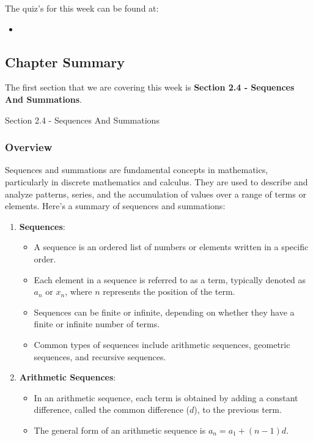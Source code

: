 The quiz's for this week can be found at:

\begin{itemize}
    \item {}
\end{itemize}

\subsection{Chapter Summary}

The first section that we are covering this week is \textbf{Section 2.4 - Sequences And Summations}.

\begin{notes}{Section 2.4 - Sequences And Summations}
    \subsubsection*{Overview}

    Sequences and summations are fundamental concepts in mathematics, particularly in discrete mathematics and calculus. They are used to describe and analyze patterns, series, and the accumulation 
    of values over a range of terms or elements. Here's a summary of sequences and summations:

    \begin{enumerate}[label=\arabic*.]
        \item \textbf{Sequences}:
        \begin{itemize}
            \item A sequence is an ordered list of numbers or elements written in a specific order.
            \item Each element in a sequence is referred to as a term, typically denoted as $a_n$ or $x_n$, where $n$ represents the position of the term.
            \item Sequences can be finite or infinite, depending on whether they have a finite or infinite number of terms.
            \item Common types of sequences include arithmetic sequences, geometric sequences, and recursive sequences.
        \end{itemize}
        
        \item \textbf{Arithmetic Sequences}:
        \begin{itemize}
            \item In an arithmetic sequence, each term is obtained by adding a constant difference, called the common difference ($d$), to the previous term.
            \item The general form of an arithmetic sequence is $a_n = a_1 + (n - 1)d$.
        \end{itemize}
        

\end{enumerate}
\end{notes}
